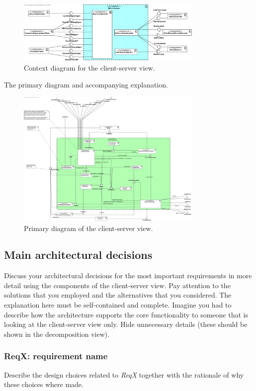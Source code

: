 \documentclass[a4paper,10pt]{article}
\begin{document}
\begin{figure}[!htp]
	\centering
	\includegraphics[width=0.8\textwidth]{ContextDiagram.png}
	\caption{Context diagram for the client-server view.}
	\label{fig:cc-context}
\end{figure}

The primary diagram and accompanying explanation.

\begin{figure}[!htp]
	\centering
	\includegraphics[width=0.8\textwidth]{ClientServerView.png}
	\caption{Primary diagram of the client-server view.}
	\label{fig:cs-primary}
\end{figure}

\subsection{Main architectural decisions}
Discuss your architectural decisions for the most important requirements in
more detail using the components of the client-server view.
Pay attention to the solutions that you employed and the alternatives that you
considered.
The explanation here must be self-contained and complete.
Imagine you had to describe how the architecture supports the core
functionality to someone that is looking at the client-server view only.
Hide unnecessary details (these should be shown in the decomposition view).

\subsubsection{ReqX\@: requirement name}
Describe the design choices related to \emph{ReqX} together with the rationale
of why these choices where made.
\end{document}

